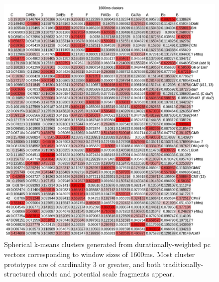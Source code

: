 \begin{figure}
	\centering
	\includegraphics[width=6.5in]{1600clusters.jpg}
	\caption{Spherical k-means clusters generated from durationally-weighted pc vectors corresponding to window sizes of 1600ms.  Most cluster prototypes are of cardinality 3 or greater, and both traditionally-structured chords and potential scale fragments appear.}
	\label{1600clusters}
\end{figure}
	
